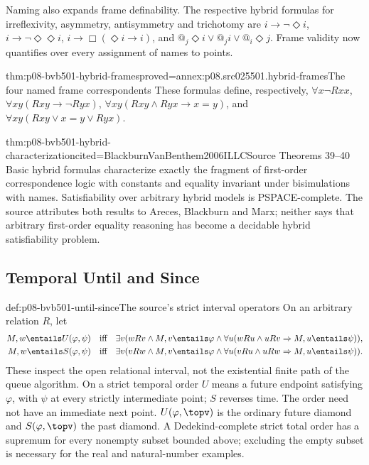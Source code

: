 Naming also expands frame definability. The respective hybrid formulas
for irreflexivity, asymmetry, antisymmetry and trichotomy are
\(i\to\neg\Diamond i\), \(i\to\neg\Diamond\Diamond i\),
\(i\to\Box(\Diamond i\to i)\), and
\(@_j\Diamond i\lor @_j i\lor @_i\Diamond j\).
Frame validity now quantifies over every assignment of names to points.

\begin{hbtheorem}{thm:p08-bvb501-hybrid-frames}{proved=annex:p08.src025501.hybrid-frames}{The four named frame correspondents}
These formulas define, respectively,
\(\forall x\neg Rxx\), \(\forall xy(Rxy\to\neg Ryx)\),
\(\forall xy(Rxy\land Ryx\to x=y)\), and
\(\forall xy(Rxy\lor x=y\lor Ryx)\).
\end{hbtheorem}

\begin{hbtheorem}{thm:p08-bvb501-hybrid-characterization}{cited=BlackburnVanBenthem2006ILLC}{Source Theorems 39--40}
Basic hybrid formulas characterize exactly the fragment of first-order
correspondence logic with constants and equality invariant under
bisimulations with names. Satisfiability over arbitrary hybrid models is
PSPACE-complete. The source attributes both results to Areces, Blackburn
and Marx; neither says that arbitrary first-order equality reasoning has
become a decidable hybrid satisfiability problem.
\end{hbtheorem}

\subsection{Temporal Until and Since}
\label{sec:p08-bvb501-temporal}

\begin{hbdefinition}{def:p08-bvb501-until-since}{The source's strict interval operators}
On an arbitrary relation \(R\), let
\[
 \begin{aligned}
 M,w\entails U(\varphi,\psi)&\quad\text{iff}\quad
  \exists v(wRv\land M,v\entails\varphi\land
     \forall u(wRu\land uRv\Rightarrow M,u\entails\psi)),\\
 M,w\entails S(\varphi,\psi)&\quad\text{iff}\quad
  \exists v(vRw\land M,v\entails\varphi\land
     \forall u(vRu\land uRw\Rightarrow M,u\entails\psi)).
 \end{aligned}
\]
These inspect the open relational interval, not the existential finite
path of the queue algorithm. On a strict temporal order \(U\)
means a future endpoint satisfying \(\varphi\), with \(\psi\)
at every strictly intermediate point; \(S\) reverses time. The
order need not have an immediate next point. \(U(\varphi,\topv)\)
is the ordinary future diamond and \(S(\varphi,\topv)\) the past
diamond. A Dedekind-complete strict total order has a supremum for every
nonempty subset bounded above; excluding the empty subset is necessary
for the real and natural-number examples.
\end{hbdefinition}

